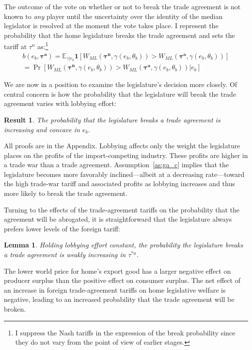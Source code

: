 \documentclass[10pt]{article}
\newtheorem{lemma}{Lemma}
\newtheorem{result}{Result}
\newcommand{\ve}{\theta}
\newcommand{\expect}{\mathbb{E}}
\newcommand{\bta}{\bm{\tau^a}}
\newcommand{\btn}{\bm{\tau^n}}
\newcommand{\ga}{\gamma}
\begin{document}
The outcome of the vote on whether or not to break the trade agreement is not known to \textit{any} player until the uncertainty over the identity of the median legislator is resolved at the moment the vote takes place. I represent the probability that the home legislature breaks the trade agreement and sets the tariff at $\tau^n$ as:\footnote{I suppress the Nash tariffs in the expression of the break probability since they do not vary from the point of view of earlier stages.}
\begin{multline}
  b(e_b,\bta) = \expect_{\ga|e_b} \bm{1} [ W_{ML}(\btn,\ga(e_b,\ve_b)) > W_{ML}\left(\bta,\ga(e_b,\ve_b)\right) ] \\ = \Pr [ W_{ML}(\btn,\ga(e_b,\ve_b)) > W_{ML}\left(\bta,\ga(e_b,\ve_b)\right) | e_b]
  \label{eq:b}
\end{multline}

We are now in a position to examine the legislature's decision more closely. Of central concern is how the probability that the legislature will break the trade agreement varies with lobbying effort: 

\begin{result}
  The probability that the legislature breaks a trade agreement is increasing and concave in $e_b$.
  \label{res:bincC}
\end{result}

\noindent All proofs are in the Appendix. Lobbying affects only the weight the legislature places on the profits of the import-competing industry. These profits are higher in a trade war than a trade agreement. Assumption~\ref{as:ga_c} implies that the legislature becomes more favorably inclined---albeit at a decreasing rate---toward the high trade-war tariff and associated profits as lobbying increases and thus more likely to break the trade agreement. 

Turning to the effects of the trade-agreement tariffs on the probability that the agreement will be abrogated, it is straightforward that the legislature always prefers lower levels of the foreign tariff:
\begin{lemma}
  Holding lobbying effort constant, the probability the legislature breaks a trade agreement is weakly increasing in $\tau^{*a}$.
  \label{lem:leg_astar}
\end{lemma}

The lower world price for home's export good has a larger negative effect on producer surplus than the positive effect on consumer surplus. The net effect of an increase in foreign trade-agreement tariffs on home legislative welfare is negative, leading to an increased probability that the trade agreement will be broken.
\end{document}
